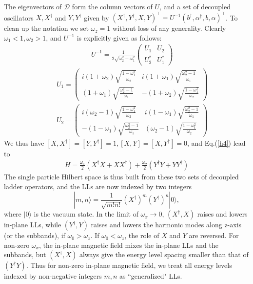 \documentclass[twocolumn,showpacs,amsmath,amstex,amssymb,mathfonts,prb]{revtex4-1}
\begin{document}
The eigenvectors of $\mathcal D$ form the column vectors of $U$, and a set of decoupled oscillators $X,X^\dagger$ and $Y,Y^\dagger$ given by $\left(X^\dagger,Y^\dagger,X,Y\right)^\intercal=U^{-1}\left(b^\dagger,\alpha^\dagger,b,\alpha\right)^\intercal$. To clean up the notation we set $\omega_z=1$ without loss of any generality. Clearly $\omega_1<1,\omega_2>1$, and $U^{-1}$ is explicitly given as follows:
\begin{eqnarray}
&&U^{-1}=\frac{1}{2\sqrt{\omega_2^2-\omega_1^2}}\left(\begin{array}{cccc}
U_{1}& U_{2}\\
U_{2}^*& U_{1}^*\end{array}
\right)
\end{eqnarray}
\footnotesize
\begin{eqnarray}
&&U_1=\left(\begin{array}{cccc}
i\left(1+\omega_2\right)\sqrt{\frac{1-\omega_1^2}{\omega_2}} & i\left(1+\omega_1\right)\sqrt{\frac{\omega_2^2-1}{\omega_1}}\\
\left(1+\omega_1\right)\sqrt{\frac{\omega_2^2-1}{\omega_1}}& -\left(1+\omega_2\right)\sqrt{\frac{1-\omega_1^2}{\omega_2}}\end{array}
\right)\\
&&U_2=\left(\begin{array}{cccc}
i\left(\omega_2-1\right)\sqrt{\frac{1-\omega_1^2}{\omega_2}}&i\left(1-\omega_1\right)\sqrt{\frac{\omega_2^2-1}{\omega_1}}\\
-\left(1-\omega_1\right)\sqrt{\frac{\omega_2^2-1}{\omega_1}} & \left(\omega_2-1\right)\sqrt{\frac{1-\omega_1^2}{\omega_2}}\end{array}
\right)
\end{eqnarray}
\normalsize
We thus have $[X,X^\dagger]=[Y,Y^\dagger]=1,[X,Y]=[X,Y^\dagger]=0$, and Eq.(\ref{h4}) lead to
\begin{eqnarray}\label{h5}
H=\frac{\omega_1}{2}\left(X^\dagger X+XX^\dagger\right)+\frac{\omega_2}{2}\left(Y^\dagger Y+YY^\dagger\right)
\end{eqnarray}
The single particle Hilbert space is thus built from these two sets of decoupled ladder operators, and the LLs are now indexed by two integers 
$$|m,n\rangle=\frac{1}{\sqrt{m!n!}}\left(X^\dagger\right)^m\left(Y^\dagger\right)^n|0\rangle,$$ where $|0\rangle$ is the vacuum state. In the limit of $\omega_x\rightarrow 0$, $\left(X^\dagger, X\right)$ raises and lowers in-plane LLs, while $\left(Y^\dagger,Y\right)$ raises and lowers the harmonic modes along z-axis (or the subbands), if $\omega_0>\omega_z$. If $\omega_0<\omega_z$, the role of $X$ and $Y$ are reversed. For non-zero $\omega_x$, the in-plane magnetic field mixes the in-plane LLs and the subbands, but $\left(X^\dagger, X\right)$ always give the energy level spacing smaller than that of $\left(Y^\dagger Y\right)$. Thus for non-zero in-plane magnetic field, we treat all energy levels indexed by non-negative integers $m, n$ as ``generalized" LLs.
\end{document}
